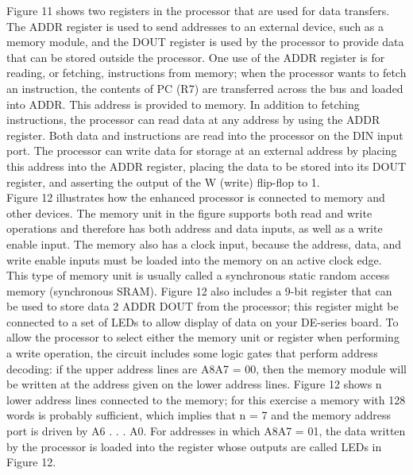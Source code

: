 \newpage
Figure 11 shows two registers in the processor that are used for data transfers. The ADDR register is used to send
addresses to an external device, such as a memory module, and the DOUT register is used by the processor to
provide data that can be stored outside the processor. One use of the ADDR register is for reading, or fetching, instructions from memory; when the processor wants to fetch an instruction, the contents of PC (R7) are transferred
across the bus and loaded into ADDR. This address is provided to memory. In addition to fetching instructions,
the processor can read data at any address by using the ADDR register. Both data and instructions are read into the
processor on the DIN input port. The processor can write data for storage at an external address by placing this
address into the ADDR register, placing the data to be stored into its DOUT register, and asserting the output of
the W (write) flip-flop to 1.\\
Figure 12 illustrates how the enhanced processor is connected to memory and other devices. The memory unit
in the figure supports both read and write operations and therefore has both address and data inputs, as well as a
write enable input. The memory also has a clock input, because the address, data, and write enable inputs must be
loaded into the memory on an active clock edge. This type of memory unit is usually called a synchronous static
random access memory (synchronous SRAM). Figure 12 also includes a 9-bit register that can be used to store data
2
ADDR DOUT
from the processor; this register might be connected to a set of LEDs to allow display of data on your DE-series
board. To allow the processor to select either the memory unit or register when performing a write operation, the
circuit includes some logic gates that perform address decoding: if the upper address lines are A8A7 = 00, then
the memory module will be written at the address given on the lower address lines. Figure 12 shows n lower
address lines connected to the memory; for this exercise a memory with 128 words is probably sufficient, which
implies that n = 7 and the memory address port is driven by A6 . . . A0. For addresses in which A8A7 = 01, the
data written by the processor is loaded into the register whose outputs are called LEDs in Figure 12.\\
